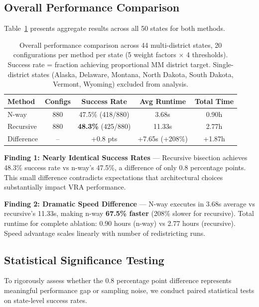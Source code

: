 \subsection{Overall Performance Comparison}

Table~\ref{tab:overall_comparison} presents aggregate results across all 50 states for both methods.

\begin{table}[h]
\centering
\begin{tabular}{lcccc}
\toprule
\textbf{Method} & \textbf{Configs} & \textbf{Success Rate} & \textbf{Avg Runtime} & \textbf{Total Time} \\
\midrule
N-way          & 880 & 47.5\% (418/880) & 3.68s & 0.90h \\
Recursive      & 880 & \textbf{48.3\%} (425/880) & 11.33s & 2.77h \\
\midrule
Difference     & --  & +0.8 pts & +7.65s (+208\%) & +1.87h \\
\bottomrule
\end{tabular}
\caption{Overall performance comparison across 44 multi-district states, 20 configurations per method per state (5 weight factors $\times$ 4 thresholds). Success rate = fraction achieving proportional MM district target. Single-district states (Alaska, Delaware, Montana, North Dakota, South Dakota, Vermont, Wyoming) excluded from analysis.}
\label{tab:overall_comparison}
\end{table}

\textbf{Finding 1: Nearly Identical Success Rates} — Recursive bisection achieves 48.3\% success rate vs n-way's 47.5\%, a difference of only 0.8 percentage points. This small difference contradicts expectations that architectural choices substantially impact VRA performance.

\textbf{Finding 2: Dramatic Speed Difference} — N-way executes in 3.68s average vs recursive's 11.33s, making n-way \textbf{67.5\% faster} (208\% slower for recursive). Total runtime for complete ablation: 0.90 hours (n-way) vs 2.77 hours (recursive). Speed advantage scales linearly with number of redistricting runs.

\subsection{Statistical Significance Testing}

To rigorously assess whether the 0.8 percentage point difference represents meaningful performance gap or sampling noise, we conduct paired statistical tests on state-level success rates.

